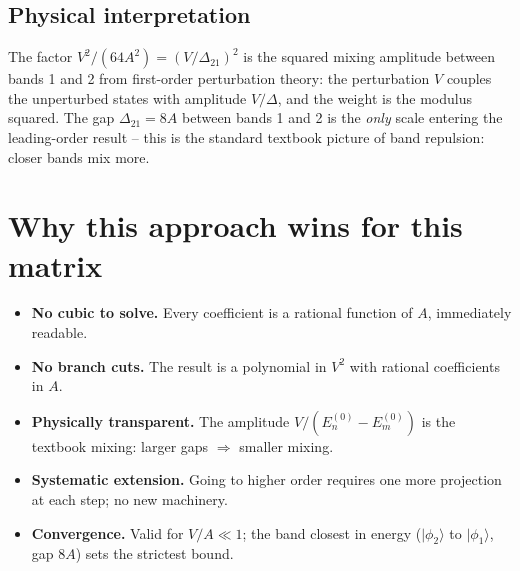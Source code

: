 \documentclass[11pt]{article}
\begin{document}
\subsection{Physical interpretation}

The factor $V^2/(64 A^2) = (V/\Delta_{21})^2$ is the squared mixing amplitude between bands 1 and 2 from first-order perturbation theory: the perturbation $V$ couples the unperturbed states with amplitude $V/\Delta$, and the weight is the modulus squared. The gap $\Delta_{21} = 8A$ between bands 1 and 2 is the \emph{only} scale entering the leading-order result -- this is the standard textbook picture of band repulsion: closer bands mix more.

\section{Why this approach wins for this matrix}

\begin{itemize}
\item \textbf{No cubic to solve.} Every coefficient is a rational function of $A$, immediately readable.
\item \textbf{No branch cuts.} The result is a polynomial in $V^2$ with rational coefficients in $A$.
\item \textbf{Physically transparent.} The amplitude $V/(E_n^{(0)}-E_m^{(0)})$ is the textbook mixing: larger gaps $\Rightarrow$ smaller mixing.
\item \textbf{Systematic extension.} Going to higher order requires one more projection at each step; no new machinery.
\item \textbf{Convergence.} Valid for $V/A \ll 1$; the band closest in energy ($|\phi_2\rangle$ to $|\phi_1\rangle$, gap $8A$) sets the strictest bound.
\end{itemize}
\end{document}
